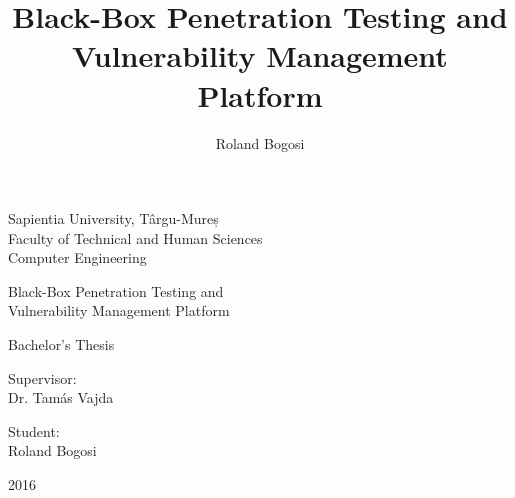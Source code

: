 \documentclass[a4paper,12pt]{article}
\author{Roland Bogosi}
\title{Black-Box Penetration Testing and Vulnerability Management Platform}
\begin{document}
%
%

%

%
%

%

%
%

\newpage
\pagestyle{empty}

	\begin{center}
		{\Large Sapientia University, Târgu-Mureș}\\\vspace{0.05in}
		{\Large Faculty of Technical and Human Sciences}\\\vspace{0.07in}
		{\Large Computer Engineering}\\
		
		\vspace{2.5in}
		
		{\huge Black-Box Penetration Testing and}\\\vspace{0.1in}
		{\huge Vulnerability Management Platform}
		
		\vspace{0.5in}
		
		{\LARGE Bachelor's Thesis}
		
	\end{center}
	
	\vspace{2.0in}
	
	\begin{multicols}{2}
		\begin{flushleft}
			{\Large Supervisor:}\\\vspace{0.05in}
			{\LARGE {Dr. Tamás Vajda}}
		\end{flushleft}
		\columnbreak
		\begin{flushright}
			{\Large Student:}\\\vspace{0.1in}
			{\LARGE {Roland Bogosi}}
		\end{flushright}
	\end{multicols}
	
	\vspace{1.5in}
		
	\begin{center}
		{\LARGE 2016}
	\end{center}

\newpage
\pagestyle{empty}
\end{document}
